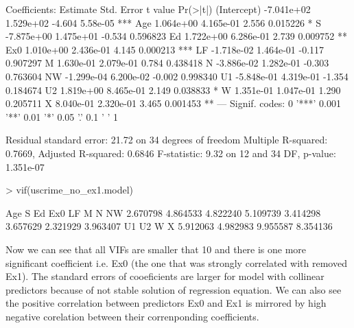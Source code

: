 \documentclass[a4paper]{article}
\begin{document}
\begin{itemize}
\begin{Schunk}
\begin{Soutput}
Coefficients:
              Estimate Std. Error t value Pr(>|t|)    
(Intercept) -7.041e+02  1.529e+02  -4.604 5.58e-05 ***
Age          1.064e+00  4.165e-01   2.556 0.015226 *  
S           -7.875e+00  1.475e+01  -0.534 0.596823    
Ed           1.722e+00  6.286e-01   2.739 0.009752 ** 
Ex0          1.010e+00  2.436e-01   4.145 0.000213 ***
LF          -1.718e-02  1.464e-01  -0.117 0.907297    
M            1.630e-01  2.079e-01   0.784 0.438418    
N           -3.886e-02  1.282e-01  -0.303 0.763604    
NW          -1.299e-04  6.200e-02  -0.002 0.998340    
U1          -5.848e-01  4.319e-01  -1.354 0.184674    
U2           1.819e+00  8.465e-01   2.149 0.038833 *  
W            1.351e-01  1.047e-01   1.290 0.205711    
X            8.040e-01  2.320e-01   3.465 0.001453 ** 
---
Signif. codes:  0 '***' 0.001 '**' 0.01 '*' 0.05 '.' 0.1 ' ' 1

Residual standard error: 21.72 on 34 degrees of freedom
Multiple R-squared:  0.7669,	Adjusted R-squared:  0.6846 
F-statistic:  9.32 on 12 and 34 DF,  p-value: 1.351e-07
\end{Soutput}
\begin{Sinput}
> vif(uscrime_no_ex1.model)
\end{Sinput}
\begin{Soutput}
     Age        S       Ed      Ex0       LF        M        N       NW 
2.670798 4.864533 4.822240 5.109739 3.414298 3.657629 2.321929 3.963407 
      U1       U2        W        X 
5.912063 4.982983 9.955587 8.354136 
\end{Soutput}
\end{Schunk}
Now we can see that all VIFs are smaller that 10 and there is one more
significant coefficient i.e. Ex0 (the one that was strongly correlated with
removed Ex1).
The standard errors of cooeficients are larger for model with collinear
predictors because of not stable solution of regression equation. We can also
see the positive correlation between predictors Ex0 and Ex1 is mirrored by high
negative corelation between their correnponding coefficients. 
\end{itemize}
\end{document}
